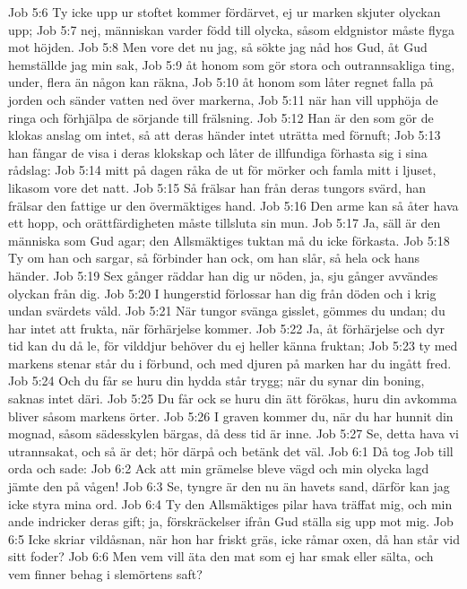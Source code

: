 Job 5:6  Ty icke upp ur stoftet kommer fördärvet, ej ur marken skjuter olyckan upp;
Job 5:7  nej, människan varder född till olycka, såsom eldgnistor måste flyga mot höjden.
Job 5:8  Men vore det nu jag, så sökte jag nåd hos Gud, åt Gud hemställde jag min sak,
Job 5:9  åt honom som gör stora och outrannsakliga ting, under, flera än någon kan räkna,
Job 5:10  åt honom som låter regnet falla på jorden och sänder vatten ned över markerna,
Job 5:11  när han vill upphöja de ringa och förhjälpa de sörjande till frälsning.
Job 5:12  Han är den som gör de klokas anslag om intet, så att deras händer intet uträtta med förnuft;
Job 5:13  han fångar de visa i deras klokskap och låter de illfundiga förhasta sig i sina rådslag:
Job 5:14  mitt på dagen råka de ut för mörker och famla mitt i ljuset, likasom vore det natt.
Job 5:15  Så frälsar han från deras tungors svärd, han frälsar den fattige ur den övermäktiges hand.
Job 5:16  Den arme kan så åter hava ett hopp, och orättfärdigheten måste tillsluta sin mun.
Job 5:17  Ja, säll är den människa som Gud agar; den Allsmäktiges tuktan må du icke förkasta.
Job 5:18  Ty om han och sargar, så förbinder han ock, om han slår, så hela ock hans händer.
Job 5:19  Sex gånger räddar han dig ur nöden, ja, sju gånger avvändes olyckan från dig.
Job 5:20  I hungerstid förlossar han dig från döden och i krig undan svärdets våld.
Job 5:21  När tungor svänga gisslet, gömmes du undan; du har intet att frukta, när förhärjelse kommer.
Job 5:22  Ja, åt förhärjelse och dyr tid kan du då le, för vilddjur behöver du ej heller känna fruktan;
Job 5:23  ty med markens stenar står du i förbund, och med djuren på marken har du ingått fred.
Job 5:24  Och du får se huru din hydda står trygg; när du synar din boning, saknas intet däri.
Job 5:25  Du får ock se huru din ätt förökas, huru din avkomma bliver såsom markens örter.
Job 5:26  I graven kommer du, när du har hunnit din mognad, såsom sädesskylen bärgas, då dess tid är inne.
Job 5:27  Se, detta hava vi utrannsakat, och så är det; hör därpå och betänk det väl.
Job 6:1  Då tog Job till orda och sade:
Job 6:2  Ack att min grämelse bleve vägd och min olycka lagd jämte den på vågen!
Job 6:3  Se, tyngre är den nu än havets sand, därför kan jag icke styra mina ord.
Job 6:4  Ty den Allsmäktiges pilar hava träffat mig, och min ande indricker deras gift; ja, förskräckelser ifrån Gud ställa sig upp mot mig.
Job 6:5  Icke skriar vildåsnan, när hon har friskt gräs, icke råmar oxen, då han står vid sitt foder?
Job 6:6  Men vem vill äta den mat som ej har smak eller sälta, och vem finner behag i slemörtens saft?
